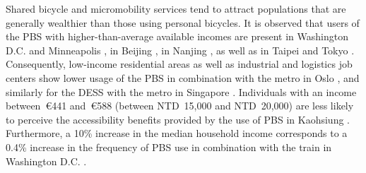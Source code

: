\begin{refsegment}
Shared bicycle and micromobility services tend to attract populations that are generally wealthier than those using personal bicycles. It is observed that users of the \acrshort{PBS} with higher-than-average available incomes are present in Washington D.C. and Minneapolis \textcolor{blue}{\autocite[321]{martin_evaluating_2014}}, in Beijing \textcolor{blue}{\autocite[55]{zhao_bicycle-metro_2017}}, in Nanjing \textcolor{blue}{\autocite[7]{yang_empirical_2016}}, as well as in Taipei and Tokyo \textcolor{blue}{\autocite[216]{lin_built_2018}}. Consequently, low-income residential areas as well as industrial and logistics job centers show lower usage of the \acrshort{PBS} in combination with the metro in Oslo \textcolor{blue}{\autocite[399]{bocker_bike_2020}}, and similarly for the \acrshort{DESS} with the metro in Singapore \textcolor{blue}{\autocite[184]{cao_e-scooter_2021}}. Individuals with an income between~\euro441 and~\euro588 (between NTD~15,000 and NTD~20,000) are less likely to perceive the accessibility benefits provided by the use of \acrshort{PBS} in Kaohsiung \textcolor{blue}{\autocite[25]{cheng_expanding_2018}}. Furthermore, a 10\% increase in the median household income corresponds to a 0.4\% increase in the frequency of \acrshort{PBS} use in combination with the train in Washington D.C. \textcolor{blue}{\autocite[8]{ma_bicycle_2015}}.%


\end{refsegment}
